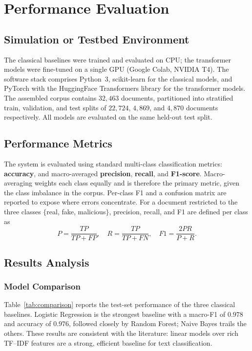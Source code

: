 \chapter{Performance Evaluation}
\label{ch:results}

\section{Simulation or Testbed Environment}
The classical baselines were trained and evaluated on CPU; the transformer models
were fine-tuned on a single GPU (Google Colab, NVIDIA T4). The software stack
comprises Python~3, scikit-learn for the classical models, and PyTorch with the
HuggingFace Transformers library for the transformer models. The assembled corpus
contains $32{,}463$ documents, partitioned into stratified train, validation, and
test splits of $22{,}724$, $4{,}869$, and $4{,}870$ documents respectively. All
models are evaluated on the same held-out test split.

\section{Performance Metrics}
The system is evaluated using standard multi-class classification metrics:
\textbf{accuracy}, and macro-averaged \textbf{precision}, \textbf{recall}, and
\textbf{F1-score}. Macro-averaging weights each class equally and is therefore
the primary metric, given the class imbalance in the corpus. Per-class F1 and a
confusion matrix are reported to expose where errors concentrate. For a document
restricted to the three classes $\{$real, fake, malicious$\}$, precision, recall,
and F1 are defined per class as
\[
  P = \frac{TP}{TP+FP},\quad
  R = \frac{TP}{TP+FN},\quad
  F1 = \frac{2PR}{P+R}.
\]

\section{Results Analysis}
\label{sec:results}

\subsection{Model Comparison}
Table~\ref{tab:comparison} reports the test-set performance of the three classical
baselines. Logistic Regression is the strongest baseline with a macro-F1 of
$0.978$ and accuracy of $0.976$, followed closely by Random Forest; Naive Bayes
trails the others. These results are consistent with the literature: linear
models over rich TF--IDF features are a strong, efficient baseline for text
classification.

